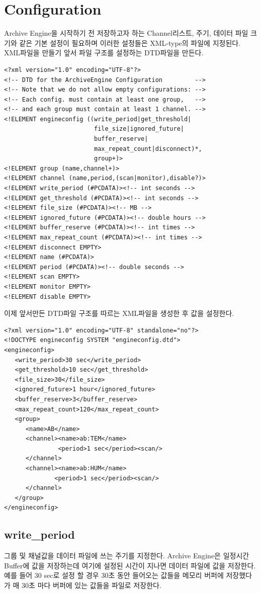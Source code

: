 \documentclass[11pt
  , a4paper
  , article
  , oneside
]{memoir}
\begin{document}
\section{Configuration}
Archive Engine을 시작하기 전 저장하고자 하는 Channel리스트, 주기, 데이터 파일 크기와 같은
기본 설정이 필요하며 이러한 설정들은 XML-type의 파일에 지정된다. XML파일을 만들기 앞서
파일 구조를 설정하는 DTD파일을 만든다.
\begin{lstlisting}[style=termstyle]
<?xml version="1.0" encoding="UTF-8"?>
<!-- DTD for the ArchiveEngine Configuration         -->
<!-- Note that we do not allow empty configurations: -->
<!-- Each config. must contain at least one group,   -->
<!-- and each group must contain at least 1 channel. -->
<!ELEMENT engineconfig ((write_period|get_threshold|
                         file_size|ignored_future|
                         buffer_reserve|
                         max_repeat_count|disconnect)*,
                         group+)>
<!ELEMENT group (name,channel+)>
<!ELEMENT channel (name,period,(scan|monitor),disable?)>
<!ELEMENT write_period (#PCDATA)><!-- int seconds -->
<!ELEMENT get_threshold (#PCDATA)><!-- int seconds -->
<!ELEMENT file_size (#PCDATA)><!-- MB -->
<!ELEMENT ignored_future (#PCDATA)><!-- double hours -->
<!ELEMENT buffer_reserve (#PCDATA)><!-- int times -->
<!ELEMENT max_repeat_count (#PCDATA)><!-- int times -->
<!ELEMENT disconnect EMPTY>
<!ELEMENT name (#PCDATA)>
<!ELEMENT period (#PCDATA)><!-- double seconds -->
<!ELEMENT scan EMPTY>
<!ELEMENT monitor EMPTY>
<!ELEMENT disable EMPTY>
\end{lstlisting} 
이제 앞서만든 DTD파일 구조를 따르는 XML파일을 생성한 후 값을 설정한다.
\begin{lstlisting}[style=termstyle]
<?xml version="1.0" encoding="UTF-8" standalone="no"?>
<!DOCTYPE engineconfig SYSTEM "engineconfig.dtd">
<engineconfig>
   <write_period>30 sec</write_period>
   <get_threshold>10 sec</get_threshold>
   <file_size>30</file_size>
   <ignored_future>1 hour</ignored_future>
   <buffer_reserve>3</buffer_reserve>
   <max_repeat_count>120</max_repeat_count>
   <group>
      <name>AB</name>
      <channel><name>ab:TEM</name>
               <period>1 sec</period><scan/>
      </channel>
      <channel><name>ab:HUM</name>
              <period>1 sec</period><scan/>
      </channel>
   </group>
</engineconfig>
\end{lstlisting}

\subsection{write\_period}
그룹 및 채널값을 데이터 파일에 쓰는 주기를 지정한다. Archive Engine은 일정시간
Buffer에 값을 저장하는데 여기에 설정된 시간이 지나면 데이터 파일에 값을 저장한다.
예를 들어 30 sec로 설정 할 경우 30초 동안 들어오는 값들을 메모리 버퍼에 저장했다가
매 30초 마다 버퍼에 있는 값들을 파일로 저장한다.
\end{document}
